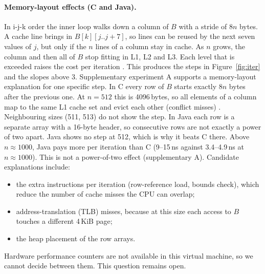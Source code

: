 \documentclass[10pt,a4paper]{article}
\begin{document}
\paragraph{Memory-layout effects (C and Java).} In i-j-k order the inner loop walks down a column
of $B$ with a stride of $8n$ bytes. A cache line brings in $B[k][j..j+7]$, so lines can be reused
by the next seven values of $j$, but only if the $n$ lines of a column stay in cache. As $n$
grows, the column and then all of $B$ stop fitting in L1, L2 and L3. Each level that is exceeded
raises the cost per iteration \cite{drepper2007,hennessy2017}. This produces the steps in
Figure~\ref{fig:iter} and the slopes above 3. Supplementary experiment A supports a
memory-layout explanation for one specific step. In C every row of $B$ starts exactly $8n$ bytes
after the previous one. At $n=512$ this is 4096\,bytes, so all elements of a column map to the
same L1 cache set and evict each other (conflict misses) \cite{lam1991}. Neighbouring sizes
(511, 513) do not show the step. In Java each row is a separate array with a 16-byte header, so
consecutive rows are not exactly a power of two apart. Java shows no step at 512, which is why it
beats C there. Above $n\approx1000$, Java pays more per iteration than C (9--15\,ns against
3.4--4.9\,ns at $n\approx1000$). This is not a power-of-two effect (supplementary A). Candidate
explanations include:
\begin{itemize}
\item the extra instructions per iteration (row-reference load, bounds check), which reduce the
number of cache misses the CPU can overlap;
\item address-translation (TLB) misses, because at this size each access to $B$ touches a
different 4\,KiB page;
\item the heap placement of the row arrays.
\end{itemize}
Hardware performance counters are not available in this virtual machine, so we cannot decide
between them. This question remains open.
\end{document}
